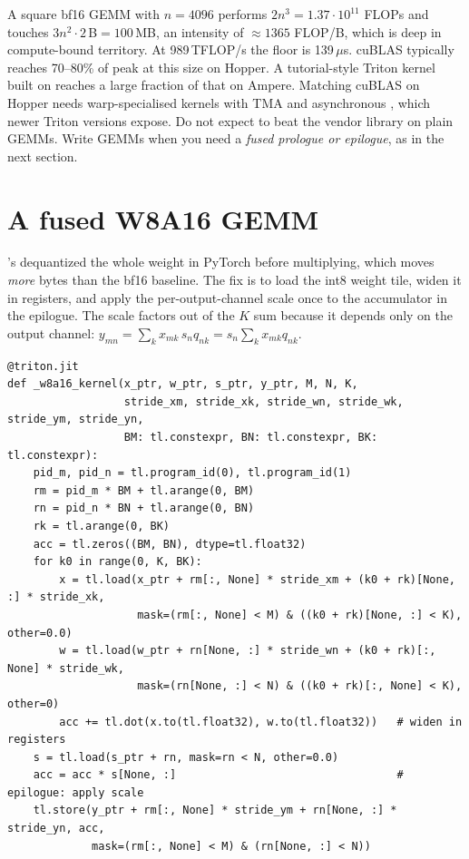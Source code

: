 \begin{napkinmath}
A square bf16 GEMM with $n=4096$ performs $2n^3=1.37\cdot10^{11}$ FLOPs and touches
$3n^2\cdot2$\,B$=100$\,MB, an intensity of $\approx1365$ FLOP/B, which is deep in
compute-bound territory. At 989\,TFLOP/s the floor is 139\,$\mu$s. cuBLAS typically
reaches 70--80\% of peak at this size on Hopper. A tutorial-style Triton kernel built on
 reaches a large fraction of that on Ampere. Matching cuBLAS on Hopper needs
warp-specialised kernels with TMA and asynchronous , which newer Triton
versions expose. Do not expect to beat the vendor library on plain GEMMs. Write GEMMs
when you need a \emph{fused prologue or epilogue}, as in the next section.
\end{napkinmath}

\section{A fused W8A16 GEMM}\label{sec:triton:w8a16}
's  dequantized the whole weight in PyTorch before
multiplying, which moves \emph{more} bytes than the bf16 baseline. The fix is to load the
int8 weight tile, widen it in registers, and apply the per-output-channel scale once to
the accumulator in the epilogue. The scale factors out of the $K$ sum because it depends
only on the output channel:
$y_{mn}=\sum_k x_{mk}\,s_n q_{nk}=s_n\sum_k x_{mk}q_{nk}$.

\begin{lstlisting}[caption={Weight-only int8 GEMM: only one byte per weight crosses HBM.},
label={lst:triton:w8a16}]
@triton.jit
def _w8a16_kernel(x_ptr, w_ptr, s_ptr, y_ptr, M, N, K,
                  stride_xm, stride_xk, stride_wn, stride_wk, stride_ym, stride_yn,
                  BM: tl.constexpr, BN: tl.constexpr, BK: tl.constexpr):
    pid_m, pid_n = tl.program_id(0), tl.program_id(1)
    rm = pid_m * BM + tl.arange(0, BM)
    rn = pid_n * BN + tl.arange(0, BN)
    rk = tl.arange(0, BK)
    acc = tl.zeros((BM, BN), dtype=tl.float32)
    for k0 in range(0, K, BK):
        x = tl.load(x_ptr + rm[:, None] * stride_xm + (k0 + rk)[None, :] * stride_xk,
                    mask=(rm[:, None] < M) & ((k0 + rk)[None, :] < K), other=0.0)
        w = tl.load(w_ptr + rn[None, :] * stride_wn + (k0 + rk)[:, None] * stride_wk,
                    mask=(rn[None, :] < N) & ((k0 + rk)[:, None] < K), other=0)
        acc += tl.dot(x.to(tl.float32), w.to(tl.float32))   # widen in registers
    s = tl.load(s_ptr + rn, mask=rn < N, other=0.0)
    acc = acc * s[None, :]                                  # epilogue: apply scale
    tl.store(y_ptr + rm[:, None] * stride_ym + rn[None, :] * stride_yn, acc,
             mask=(rm[:, None] < M) & (rn[None, :] < N))
\end{lstlisting}

